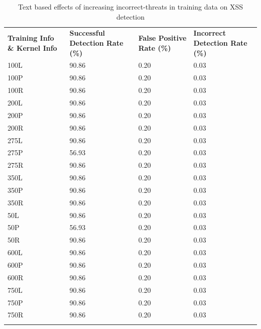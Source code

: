 \begin{appendices}
\begin{longtable}{|p{1.5in}|p{1in}|p{1in}|p{1in}|}
	\hline
	\textbf{Training Info \& Kernel Info} & \textbf{Successful Detection Rate (\%)} & \textbf{False Positive Rate (\%)} & \textbf{Incorrect Detection Rate (\%)}  \\
	\hhline{|=|=|=|=|}
 	100L & 90.86 & 0.20 & 0.03 \\ \hline
 	100P & 90.86 & 0.20 & 0.03 \\ \hline
 	100R & 90.86 & 0.20 & 0.03 \\ \hline
 	200L & 90.86 & 0.20 & 0.03 \\ \hline
 	200P & 90.86 & 0.20 & 0.03 \\ \hline
 	200R & 90.86 & 0.20 & 0.03 \\ \hline
 	275L & 90.86 & 0.20 & 0.03 \\ \hline
 	275P & 56.93 & 0.20 & 0.03 \\ \hline
 	275R & 90.86 & 0.20 & 0.03 \\ \hline
 	350L & 90.86 & 0.20 & 0.03 \\ \hline
 	350P & 90.86 & 0.20 & 0.03 \\ \hline
 	350R & 90.86 & 0.20 & 0.03 \\ \hline
  	50L & 90.86 & 0.20 & 0.03 \\ \hline
  	50P & 56.93 & 0.20 & 0.03 \\ \hline
  	50R & 90.86 & 0.20 & 0.03 \\ \hline
 	600L & 90.86 & 0.20 & 0.03 \\ \hline
 	600P & 90.86 & 0.20 & 0.03 \\ \hline
 	600R & 90.86 & 0.20 & 0.03 \\ \hline
 	750L & 90.86 & 0.20 & 0.03 \\ \hline
 	750P & 90.86 & 0.20 & 0.03 \\ \hline
 	750R & 90.86 & 0.20 & 0.03 \\ \hline
 	\caption{Text based effects of increasing incorrect-threats in training data on XSS detection}
\end{longtable}


\end{appendices}
